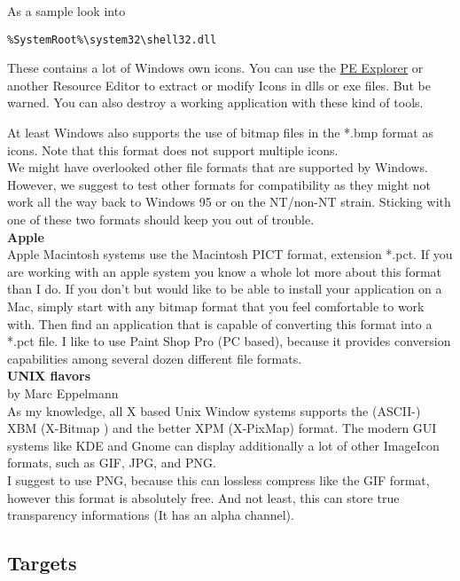 As a sample look into
\begin{verbatim}
%SystemRoot%\system32\shell32.dll
\end{verbatim}
These contains a lot of Windows own icons.
You can use the \href{http://www.heaventools.com}{PE Explorer}
or another Resource Editor to extract or modify
Icons in dlls or exe  files. But be warned. You can also destroy a working
application with these kind of tools.

At least Windows also supports the use of bitmap files in the *.bmp format as
icons. Note that this format does not support multiple icons.\\

We might have overlooked other file formats that are supported by Windows.
However, we suggest to test other formats for compatibility as they
might not work all the way back to Windows 95 or on the NT/non-NT strain.
Sticking with one of these two formats should keep you out of trouble.\\

\textbf{Apple}\\

Apple Macintosh systems use the Macintosh PICT format, extension *.pct.
If you are working with an apple system you know a whole lot more about
this format than I do. If you don't but would like to be able to install
your application on a Mac, simply start with any bitmap format that you
feel comfortable to work with. Then find an application that is capable
of converting this format into a *.pct file. I like to use Paint Shop
Pro (PC based), because it provides conversion capabilities among
several dozen different file formats.\\

\textbf{UNIX flavors}\\

by Marc Eppelmann\\

As my knowledge, all X based Unix Window systems supports
the (ASCII-) XBM (X-Bitmap ) and the better XPM (X-PixMap) format.
The modern GUI systems like KDE and Gnome can display additionally
a lot of other ImageIcon formats, such as GIF, JPG, and PNG.\\

I suggest to use PNG, because this can lossless compress like the GIF format,
however this format is absolutely free. And not least, this can store true
transparency informations (It has an alpha channel).

\subsection{Targets}

